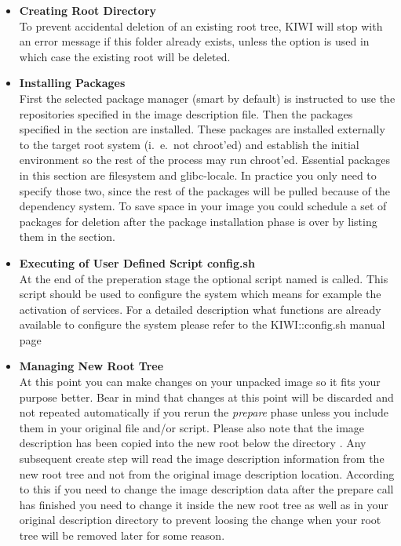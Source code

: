 \begin{itemize}
\item \textbf{Creating Root Directory}\\
      To prevent accidental deletion of an existing root tree, KIWI will
      stop with an error message if this folder already exists, unless the
      option  is used in which case the existing root will
      be deleted.
\item \textbf{Installing Packages}\\
      First the selected package manager (smart by default) is instructed to
      use the repositories specified in the image description file.
      Then the packages specified in the  section are installed.
      These packages are installed externally to the target root system
      (i.~e.\ not chroot'ed) and establish the initial environment so the rest
      of  the process may run chroot'ed. Essential packages in this section
      are filesystem and glibc-locale. In practice you only need to
      specify those two, since the rest of the packages will be pulled
      because of the dependency system. To save space in your image you
      could schedule a set of packages for deletion after the package
      installation phase is over by listing them in the  section.
\item \textbf{Executing of User Defined Script config.sh}\\
      At the end of the preperation stage the optional script named 
      is called. This script should be used to configure the system which means
      for example the activation of services. For a detailed description what
      functions are already available to configure the system please refer to
      the KIWI::config.sh manual page
\item \textbf{Managing New Root Tree}\\
      At this point you can make changes on your unpacked image so it fits
      your purpose better. Bear in mind that changes at this point will be
      discarded and not repeated automatically if you rerun the \emph{prepare}
      phase unless you include them in your original  file and/or
       script. Please also note that the image description has
      been copied into the new root below the directory
      . Any subsequent create step will read
      the image description information from the new root tree and not
      from the original image description location. According to this
      if you need to change the image description data
      after the prepare call has finished you need to change it inside the
      new root tree as well as in your original description directory to
      prevent loosing the change when your root tree will be removed later
      for some reason.
\end{itemize}

